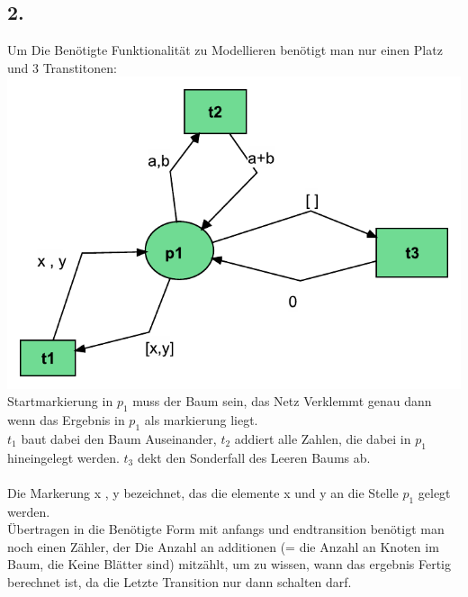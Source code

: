 \documentclass[12pt,a4paper]{article}
\begin{document}
\subsection*{2.}
%
Um Die Benötigte Funktionalität zu Modellieren benötigt man nur einen Platz und 3 Transtitonen:\\
\includegraphics[scale=1.0]{Teilaufgaben/einfach.pdf}\\
Startmarkierung in $p_1$ muss der Baum sein, das Netz Verklemmt genau dann wenn das Ergebnis in $p_1$ als markierung liegt.\\
$t_1$ baut dabei den Baum Auseinander, $t_2$ addiert alle Zahlen, die dabei in $p_1$ hineingelegt werden. $t_3$ dekt den Sonderfall des Leeren Baums ab.\\
\\
Die Markerung x , y bezeichnet, das die elemente x und y an die Stelle $p_1$ gelegt werden.
\\
Übertragen in die Benötigte Form mit anfangs und endtransition benötigt man noch einen Zähler, der Die Anzahl an additionen (= die Anzahl an Knoten im Baum, die Keine Blätter sind) mitzählt, um zu wissen, wann das ergebnis Fertig berechnet ist, da die Letzte Transition nur dann schalten darf.
\end{document}
